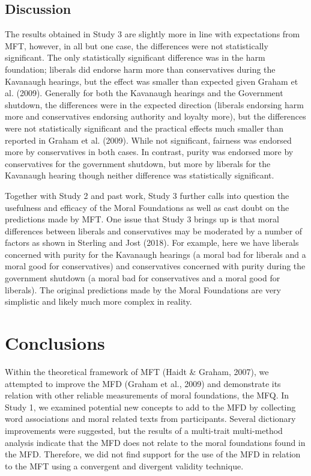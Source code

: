\documentclass[
  man,floatsintext]{apa6}
\begin{document}
\subsection{Discussion}\label{discussion-2}

The results obtained in Study 3 are slightly more in line with
expectations from MFT, however, in all but one case, the differences
were not statistically significant. The only statistically significant
difference was in the harm foundation; liberals did endorse harm more
than conservatives during the Kavanaugh hearings, but the effect was
smaller than expected given Graham et al. (2009). Generally for both the
Kavanaugh hearings and the Government shutdown, the differences were in
the expected direction (liberals endorsing harm more and conservatives
endorsing authority and loyalty more), but the differences were not
statistically significant and the practical effects much smaller than
reported in Graham et al. (2009). While not significant, fairness was endorsed
more by conservatives in both cases. In contrast, purity was endorsed
more by conservatives for the government shutdown, but more by liberals
for the Kavanaugh hearing though neither difference was statistically
significant.

Together with Study 2 and past work, Study 3 further calls into question
the usefulness and efficacy of the Moral Foundations as well as cast
doubt on the predictions made by MFT. One issue that Study 3 brings up
is that moral differences between liberals and conservatives may be
moderated by a number of factors as shown in Sterling and Jost (2018). For example,
here we have liberals concerned with purity for the Kavanaugh hearings
(a moral bad for liberals and a moral good for conservatives) and
conservatives concerned with purity during the government shutdown (a
moral bad for conservatives and a moral good for liberals). The original
predictions made by the Moral Foundations are very simplistic and likely
much more complex in reality.

\section{Conclusions}\label{conclusions}

Within the theoretical framework of MFT (Haidt \& Graham, 2007), we attempted to improve the MFD (Graham et al., 2009) and demonstrate its relation with other reliable measurements of moral foundations, the MFQ. In Study 1, we examined potential new concepts to add to the MFD by collecting word associations and moral related texts from participants. Several dictionary improvements were suggested, but the results of a multi-trait multi-method analysis indicate that the MFD does not relate to the moral foundations found in the MFD. Therefore, we did not find support for the use of the MFD in relation to the MFT using a convergent and divergent validity technique.
\end{document}
